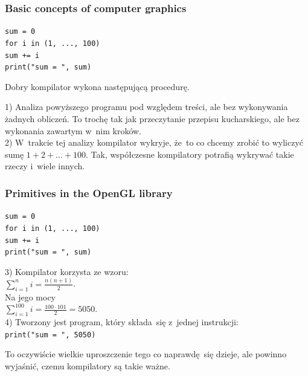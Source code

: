 \documentclass[10pt,t]{beamer}
\begin{document}
\begin{frame}
  \frametitle{Basic concepts of computer graphics}


  \texttt{sum = 0} \\

  \texttt{for i in (1, ..., 100)} \\
  \hphantom{aaaa} \texttt{sum += i} \\

  \texttt{print("sum = ", sum)}

  Dobry kompilator wykona następującą procedurę.

  1) Analiza powyższego programu pod względem treści, ale \alert{bez}
  wykonywania żadnych obliczeń. To trochę tak jak przeczytanie przepisu
  kucharskiego, ale bez wykonania zawartym w~nim kroków. \\
  2) W~trakcie tej analizy kompilator wykryje, że~to co chcemy
  zrobić to wyliczyć sumę $1 + 2 + \ldots + 100$. Tak, współczesne kompilatory
  potrafią wykrywać takie rzeczy i~wiele innych. \\

\end{frame}





\begin{frame}
  \frametitle{Primitives in the OpenGL library}


  \texttt{sum = 0} \\

  \texttt{for i in (1, ..., 100)} \\
  \hphantom{aaaa} \texttt{sum += i} \\

  \texttt{print("sum = ", sum)}

  3) Kompilator korzysta ze wzoru: \\[0.3em]
  $\displaystyle \sum_{ i = 1 }^{ n } i = \frac{ n ( n + 1 ) }{ 2 }$. \\[0.5em]
  Na jego mocy \\[0.3em]
  $\displaystyle \sum_{ i = 1 }^{ 100 } i = \frac{ 100 \cdot 101 }{ 2 } = 5050$.
  \\[0.5em]
  4) Tworzony jest program, który składa~się z~jednej instrukcji: \\
  \texttt{print("sum = ", 5050)}

  To oczywiście wielkie uproszczenie tego co naprawdę~się dzieje,
  ale powinno wyjaśnić, czemu kompilatory są takie ważne.

\end{frame}
\end{document}
